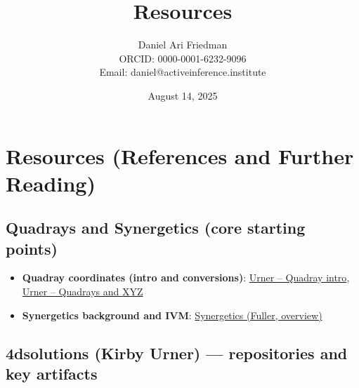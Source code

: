 \documentclass[
]{article}
\title{Resources}
\author{Daniel Ari Friedman\\ ORCID: 0000-0001-6232-9096\\ Email: daniel@activeinference.institute}
\date{August 14, 2025}
\providecommand{\tightlist}{%
  \setlength{\itemsep}{0pt}\setlength{\parskip}{0pt}}
\begin{document}
\maketitle

\hypertarget{resources-references-and-further-reading}{%
\section{Resources (References and Further
Reading)}\label{resources-references-and-further-reading}}

\hypertarget{quadrays-and-synergetics-core-starting-points}{%
\subsection{Quadrays and Synergetics (core starting
points)}\label{quadrays-and-synergetics-core-starting-points}}

\begin{itemize}
\tightlist
\item
  \textbf{Quadray coordinates (intro and conversions)}:
  \href{https://www.grunch.net/synergetics/quadintro.html}{Urner --
  Quadray intro},
  \href{https://www.grunch.net/synergetics/quadxyz.html}{Urner --
  Quadrays and XYZ}
\item
  \textbf{Synergetics background and IVM}:
  \href{https://en.wikipedia.org/wiki/Synergetics_(Fuller)}{Synergetics
  (Fuller, overview)}
\end{itemize}

\hypertarget{dsolutions-kirby-urner-repositories-and-key-artifacts}{%
\subsection{4dsolutions (Kirby Urner) --- repositories and key
artifacts}\label{dsolutions-kirby-urner-repositories-and-key-artifacts}}
\end{document}
